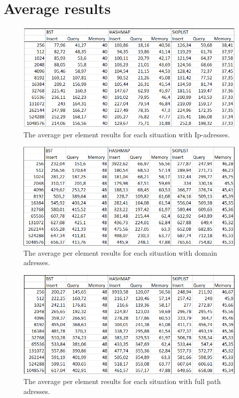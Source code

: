 \documentclass[12pt,a4paper]{article}
\begin{document}
    \newpage
    \appendix
    \section{Average results} \label{App:AveResults}

    \begin{figure}[h!]
    \centering
    \includegraphics[width=\textwidth]{Ip-address_averages.png}
    \caption{The average per element results for each situation with Ip-adresses.}
    \end{figure}

    \begin{figure}[h!]
    \centering
    \includegraphics[width=\textwidth]{Domain_averages.png}
    \caption{The average per element results for each situation with domain adresses.}
    \end{figure}

    \begin{figure}[h!]
    \centering
    \includegraphics[width=\textwidth]{Full_path_averages.png}
    \caption{The average per element results for each situation with full path adresses.}
    \end{figure}
\end{document}
